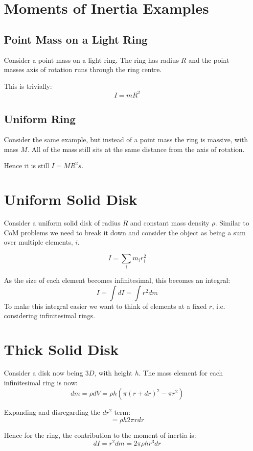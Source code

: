 
\section{Moments of Inertia Examples}
\subsection{Point Mass on a Light Ring}
Consider a point mass on a light ring. The ring has radius $R$ and the point masses axis of rotation runs through the ring centre. 

This is trivially:
\[
    I = mR^2
\]

\subsection{Uniform Ring}
Consider the same example, but instead of a point mass the ring is massive, with mass $M$. All of the mass still sits at the same distance from the axis of rotation.

Hence it is still $I = MR^2s$.

\section{Uniform Solid Disk}
Consider a uniform solid disk of radius $R$ and constant mass density $\rho$. Similar to CoM problems we need to break it down and consider the object as being a sum over multiple elements, $i$.

\[
    I = \sum_i m_i r_i^2
\]

As the size of each element becomes infinitesimal, this becomes an integral:
\[
    I = \int dI = \int r^2 dm
\]
To make this integral easier we want to think of elements at a fixed $r$, i.e. considering infinitesimal rings.

\section{Thick Solid Disk}
Consider a disk now being $3D$, with height $h$. The mass element for each infinitesimal ring is now:
\[
    dm = \rho dV = \rho h \left(\pi (r + dr)^2 - \pi r^2\right)
\]

Expanding and disregarding the $dr^2$ term:
\[
= \rho h 2 \pi r dr
\]

Hence for the ring, the contribution to the moment of inertia is:
\[
    dI = r^2 dm = 2 \pi \rho h r^3 dr
\]

